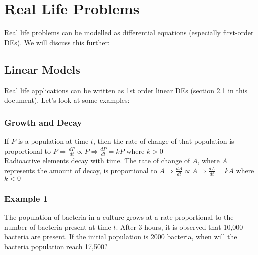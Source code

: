 \documentclass{article}
\begin{document}
\newpage\section{Real Life Problems}
Real life problems can be modelled as differential equations (especially first-order DEs). We will discuss this further:

\subsection{Linear Models} Real life applications can be written as 1st order linear DEs (section 2.1 in this document).
Let's look at some examples:

\subsubsection{Growth and Decay}
If $P$ is a population at time $t$, then the rate of change of that population is proportional to $P\Rightarrow\frac{dP}{dt}\propto P\Rightarrow \frac{dP}{dt}=kP$ where $k>0$
\\Radioactive elements decay with time. The rate of change of $A$, where $A$ represents the amount of decay,
is proportional to $A\Rightarrow\frac{dA}{dt}\propto A\Rightarrow\frac{dA}{dt}=kA$ where $k<0$

\subsubsection{Example 1}
The population of bacteria in a culture grows at a rate proportional to the number of bacteria present at time $t$.
After 3 hours, it is observed that 10,000 bacteria are present. If the initial population is 2000 bacteria,
when will the bacteria population reach 17,500?
\end{document}
